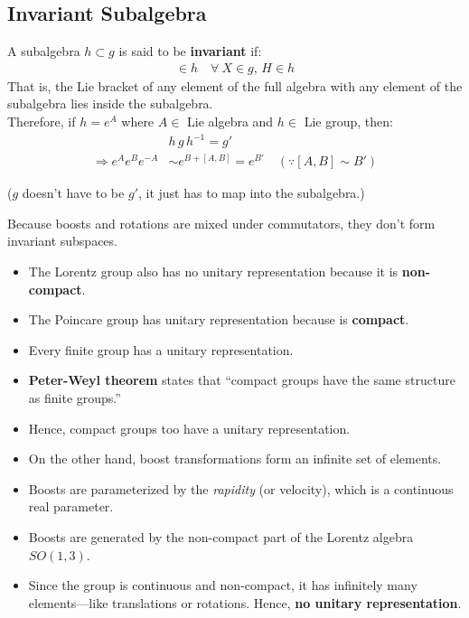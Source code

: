 \documentclass[14pt]{article} %
\begin{document}
\subsection*{Invariant Subalgebra}
A subalgebra $h \subset g$ is said to be \textbf{invariant} if:
\begin{align*}
[X,H] \in h \quad \forall~ X \in g, \, H \in h
\end{align*}
That is, the Lie bracket of any element of the full algebra with any element of the subalgebra lies inside the subalgebra.\\
Therefore, if $h = e^A$ where $A \in$ Lie algebra and $h \in$ Lie group, then:
\begin{align*}
&h\,g\,h^{-1} = g' \\
\Rightarrow e^A e^B e^{-A} &\sim e^{B+[A,B]} = e^{B'} \quad (\because [A,B] \sim B' )
\end{align*}
\begin{center}
    ($g$ doesn’t have to be $g'$, it just has to map into the subalgebra.)
\end{center}
Because boosts and rotations are mixed under commutators, they don’t form invariant subspaces.
\begin{tcolorbox}[ title=Notes]
\begin{itemize}
    \item The Lorentz group also has no unitary representation because it is \textbf{non-compact}.
    \item The Poincare group has unitary representation because is \textbf{compact}.
    \item Every finite group has a unitary representation.
    \item \textbf{Peter-Weyl theorem} states that “compact groups have the same structure as finite groups.”
    \item Hence, compact groups too have a unitary representation.
    \item On the other hand, boost transformations form an infinite set of elements.
    \item Boosts are parameterized by the \textit{rapidity} (or velocity), which is a continuous real parameter.
    \item Boosts are generated by the non-compact part of the Lorentz algebra $SO(1,3)$.
    \item Since the group is continuous and non-compact, it has infinitely many elements—like translations or rotations. Hence, \textbf{no unitary representation}.
\end{itemize}
\end{tcolorbox}
\end{document}
